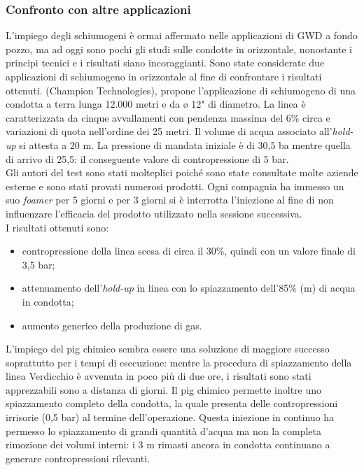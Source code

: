 \subsubsection*{Confronto con altre applicazioni}
L'impiego degli schiumogeni è ormai affermato nelle applicazioni di GWD a fondo pozzo, ma ad oggi sono pochi gli studi sulle condotte in orizzontale, nonostante i principi tecnici e i risultati siano incoraggianti. Sono state considerate due applicazioni di schiumogeno in orizzontale al fine di confrontare i risultati ottenuti.
\textcite{heuvel2011novel} (Champion Technologies), propone l'applicazione di schiumogeno di una condotta a terra lunga 12.000 metri e da ø 12" di diametro. La linea è caratterizzata da cinque avvallamenti con pendenza massima del 6\% circa e variazioni di quota nell'ordine dei 25 metri. Il volume di acqua associato all'\textit{hold-up} si attesta a 20 m. La pressione di mandata iniziale è di 30,5 ba mentre quella di arrivo di 25,5: il conseguente valore di contropressione di 5 bar.\\
Gli autori del test sono stati molteplici poiché sono state consultate molte aziende esterne e sono stati provati numerosi prodotti. Ogni compagnia ha immesso un suo \textit{foamer} per 5 giorni e per 3 giorni si è interrotta l'iniezione al fine di non influenzare l'efficacia del prodotto utilizzato nella sessione successiva. \\
I risultati ottenuti sono:
\begin{itemize}
\item contropressione della linea scesa di circa il 30\%, quindi con un valore finale di 3,5 bar;
\item attenuamento dell'\textit{hold-up} in linea con lo spiazzamento dell'85\% (m) di acqua in condotta;
\item aumento generico della produzione di gas.
\end{itemize}
L'impiego del pig chimico sembra essere una soluzione di maggiore successo soprattutto per i tempi di esecuzione: mentre la procedura di spiazzamento della linea Verdicchio è avvenuta in poco più di due ore, i risultati sono stati apprezzabili sono a distanza di giorni. Il pig chimico permette inoltre uno spiazzamento completo della condotta, la quale presenta delle contropressioni irrisorie (0,5 bar) al termine dell'operazione. Questa iniezione in continuo ha permesso lo spiazzamento di grandi quantità d'acqua ma non la completa rimozione dei volumi interni: i 3 m rimasti ancora in condotta continuano a generare contropressioni rilevanti.\\
